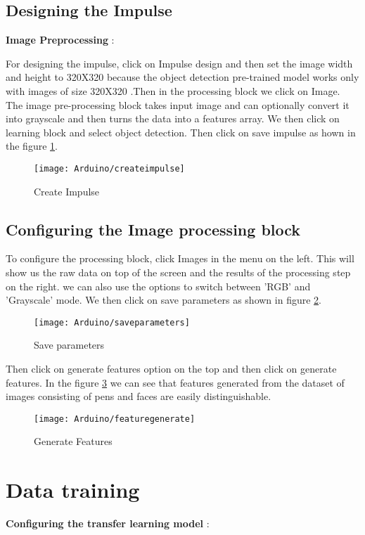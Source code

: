 	\subsection{Designing the Impulse}
	\textbf{Image Preprocessing} :
	
	For designing the impulse, click on Impulse design and then set the image width and height to 320X320 because the object detection pre-trained model works only with images of size 320X320 \cite{EdgeImpulse:2021}.Then in the processing block we click on Image. The image pre-processing block takes input image and can optionally convert it into grayscale and then turns the data into a features array.  We then click on learning block and select object detection. Then click on save impulse as hown in the figure \ref{figure 9.20}.
	\begin{figure}[H]
		\centering
		\texttt{[image: Arduino/createimpulse]}
		\caption{Create Impulse}
		\label{figure 9.20}
	\end{figure}
	\subsection{Configuring the Image processing block } 
	To configure the processing block, click Images in the menu on the left. This will show us  the raw data on top of the screen and the results of the processing step on the right. we can also use the options to switch between 'RGB' and 'Grayscale' mode. We then click on save parameters as shown in figure \ref{figure 9.21}. 
	\begin{figure}[H]
		\centering
		\texttt{[image: Arduino/saveparameters]}
		\caption{Save parameters}
		\label{figure 9.21}
	\end{figure}
	
	Then click on generate features option on the top and then click on generate features. In the figure \ref{figure 9.22} we can see that features generated from the dataset of images consisting of pens and faces are easily distinguishable.
	\begin{figure}[H]
		\centering
		\texttt{[image: Arduino/featuregenerate]}
		\caption{Generate Features}
		\label{figure 9.22}
	\end{figure}
	\section{Data training}
	\textbf{Configuring the transfer learning model} :
	
